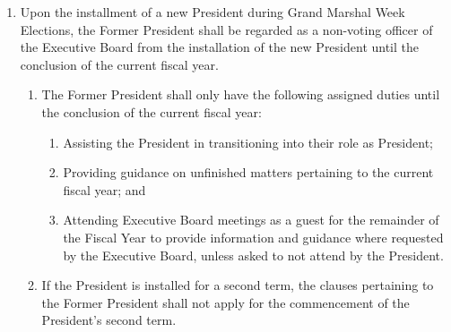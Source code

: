 \documentclass{uniondoc}
\begin{document}
\begin{enumerate}
  \begin{enumerate}
  \item All non-voting officers of the Executive Board shall serve at the leisure of the President of the Union.
  \item Any non-voting officer given comparable responsibilities to a Representative, such as representing assigned clubs, shall require the majority confirmation of the Student Senate before such duties can be conferred.
  \end{enumerate}
\item Upon the installment of a new President during Grand Marshal Week Elections, the Former President shall be regarded as a non-voting officer of the Executive Board from the installation of the new President until the conclusion of the current fiscal year.
  \begin{enumerate}
  \item The Former President shall only have the following assigned duties until the conclusion of the current fiscal year:
    \begin{enumerate}
    \item Assisting the President in transitioning into their role as President;
    \item Providing guidance on unfinished matters pertaining to the current fiscal year; and
    \item Attending Executive Board meetings as a guest for the remainder of the Fiscal Year to provide information and guidance where requested by the Executive Board, unless asked to not attend by the President.
    \end{enumerate}
  \item If the President is installed for a second term, the clauses pertaining to the Former President shall not apply for the commencement of the President’s second term.
  \end{enumerate}
\end{enumerate}

\end{document}
